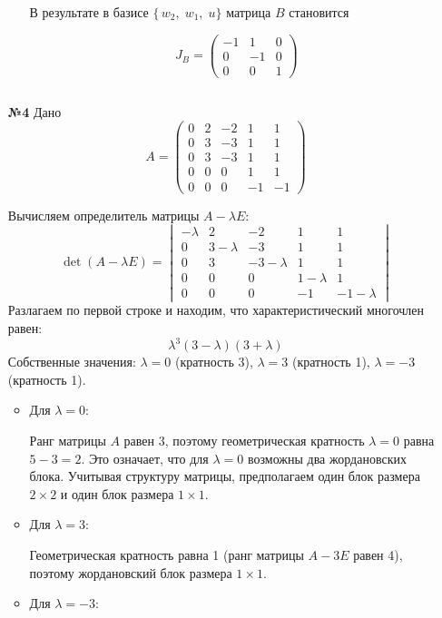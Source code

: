 \documentclass[a4paper]{article}
\begin{document}
\begin{enumerate}
\begin{enumerate}
    
      В результате в базисе $\{\,w_2,\;w_1,\;u\}$ матрица $B$ становится

    $$
    J_B = \begin{pmatrix}
    -1 & 1 & 0\\
    0  & -1& 0\\
    0  & 0 & 1
    \end{pmatrix}
    $$

  \end{enumerate}$\;$

  \item[\textbf{№4}]Дано
  $$A = \begin{pmatrix}
  0 & 2 & -2 & 1 & 1 \\
  0 & 3 & -3 & 1 & 1 \\
  0 & 3 & -3 & 1 & 1 \\
  0 & 0 & 0 & 1 & 1 \\
  0 & 0 & 0 & -1 & -1
  \end{pmatrix}$$

  Вычисляем определитель матрицы $ A - \lambda E $:
  $$
  \det(A - \lambda E) = \begin{vmatrix}
  -\lambda & 2 & -2 & 1 & 1 \\
  0 & 3 - \lambda & -3 & 1 & 1 \\
  0 & 3 & -3 - \lambda & 1 & 1 \\
  0 & 0 & 0 & 1 - \lambda & 1 \\
  0 & 0 & 0 & -1 & -1 - \lambda
  \end{vmatrix}
  $$
  Разлагаем по первой строке и находим, что характеристический многочлен равен:
  $$
  \lambda^3 (3 - \lambda)(3 + \lambda)
  $$
  Собственные значения: $\lambda = 0$ (кратность 3), $\lambda = 3$ (кратность 1), $\lambda = -3$ (кратность 1).
  \begin{itemize}
    \item Для $\lambda = 0$:
    
      Ранг матрицы $ A $ равен 3, поэтому геометрическая кратность $\lambda = 0$
       равна $5 - 3 = 2$. Это означает, что для $\lambda = 0$ 
       возможны два жордановских блока. Учитывая структуру матрицы, 
       предполагаем один блок размера $2 \times 2$ и один блок размера $1 \times 1$.
      
    \item Для $\lambda = 3$:
    
    Геометрическая кратность равна 1 (ранг матрицы $A - 3E$ равен 4), 
    поэтому жордановский блок размера $1 \times 1$.
      
    \item Для $\lambda = -3$:
    

\end{itemize}
\end{enumerate}
\end{document}
